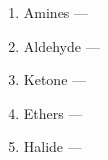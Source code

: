 \documentclass[12pt]{article}
\begin{document}
\begin{itemize}
\begin{enumerate}
      \item Amines — 

      \item Aldehyde — 

      \item Ketone — 

      \item Ethers — 

      \item Halide — 

    \end{enumerate}

\end{itemize}
\end{document}
